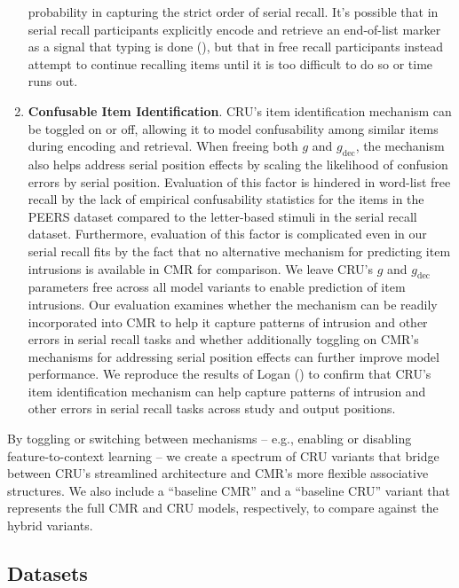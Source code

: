 \documentclass[
  man,
  floatsintext,
  longtable,
  nolmodern,
  notxfonts,
  notimes,
  draftfirst,
  colorlinks=true,linkcolor=blue,citecolor=blue,urlcolor=blue]{apa7}
\begin{document}
\begin{enumerate}
  probability in capturing the strict order of serial recall. It's
  possible that in serial recall participants explicitly encode and
  retrieve an end-of-list marker as a signal that typing is done
  (), but that in free
  recall participants instead attempt to continue recalling items until
  it is too difficult to do so or time runs out.
\item
  \textbf{Confusable Item Identification}. CRU's item identification
  mechanism can be toggled on or off, allowing it to model confusability
  among similar items during encoding and retrieval. When freeing both
  \(g\) and \(g_\text{dec}\), the mechanism also helps address serial
  position effects by scaling the likelihood of confusion errors by
  serial position. Evaluation of this factor is hindered in word-list
  free recall by the lack of empirical confusability statistics for the
  items in the PEERS dataset compared to the letter-based stimuli in the
  serial recall dataset. Furthermore, evaluation of this factor is
  complicated even in our serial recall fits by the fact that no
  alternative mechanism for predicting item intrusions is available in
  CMR for comparison. We leave CRU's \(g\) and \(g_\text{dec}\)
  parameters free across all model variants to enable prediction of item
  intrusions. Our evaluation examines whether the mechanism can be
  readily incorporated into CMR to help it capture patterns of intrusion
  and other errors in serial recall tasks and whether additionally
  toggling on CMR's mechanisms for addressing serial position effects
  can further improve model performance. We reproduce the results of
  Logan () to confirm that CRU's
  item identification mechanism can help capture patterns of intrusion
  and other errors in serial recall tasks across study and output
  positions.
\end{enumerate}

By toggling or switching between mechanisms -- e.g., enabling or
disabling feature-to-context learning -- we create a spectrum of CRU
variants that bridge between CRU's streamlined architecture and CMR's
more flexible associative structures. We also include a ``baseline CMR''
and a ``baseline CRU'' variant that represents the full CMR and CRU
models, respectively, to compare against the hybrid variants.

\subsection{Datasets}\label{datasets}
\end{document}
